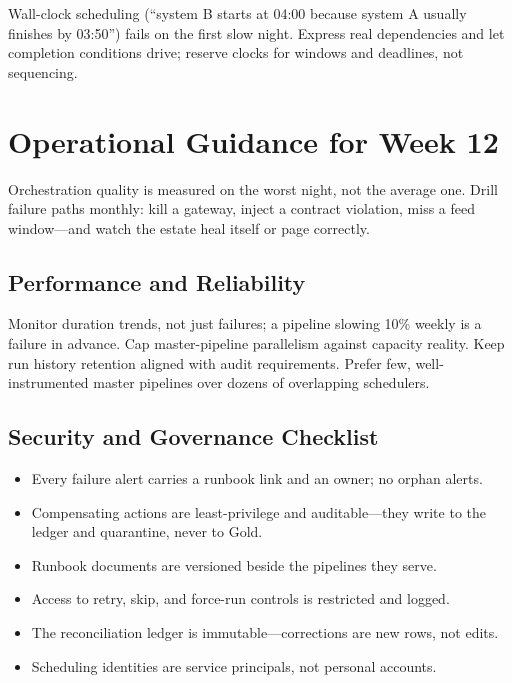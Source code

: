 \begin{pitfall}
Wall-clock scheduling (``system B starts at 04:00 because system A usually finishes by 03:50'') fails on the first slow night. Express real dependencies and let completion conditions drive; reserve clocks for windows and deadlines, not sequencing.
\end{pitfall}

\section{Operational Guidance for Week 12}
Orchestration quality is measured on the worst night, not the average one. Drill failure paths monthly: kill a gateway, inject a contract violation, miss a feed window---and watch the estate heal itself or page correctly.

\subsection{Performance and Reliability}
Monitor duration trends, not just failures; a pipeline slowing 10\% weekly is a failure in advance. Cap master-pipeline parallelism against capacity reality. Keep run history retention aligned with audit requirements. Prefer few, well-instrumented master pipelines over dozens of overlapping schedulers.

\subsection{Security and Governance Checklist}
\begin{itemize}
    \item Every failure alert carries a runbook link and an owner; no orphan alerts.
    \item Compensating actions are least-privilege and auditable---they write to the ledger and quarantine, never to Gold.
    \item Runbook documents are versioned beside the pipelines they serve.
    \item Access to retry, skip, and force-run controls is restricted and logged.
    \item The reconciliation ledger is immutable---corrections are new rows, not edits.
    \item Scheduling identities are service principals, not personal accounts.
\end{itemize}

